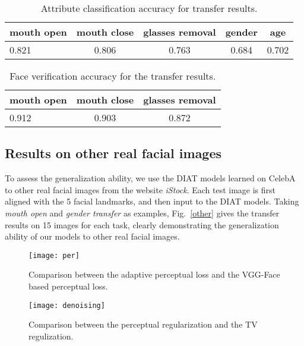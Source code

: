 \documentclass[journal]{IEEEtran}
\begin{document}
\begin{table}[htb]
\scriptsize
\caption{Attribute classification accuracy for transfer results.}
\begin{center}
\begin{tabular}{l|c|c|c|c}
\hline
mouth open & mouth close & glasses removal & gender & age  \\
\hline
0.821 & 0.806 & 0.763 & 0.684 & 0.702 \\
\hline
\end{tabular}
\end{center}
\label{table:classification}
\end{table}

\begin{table}[htb]
\scriptsize
\caption{Face verification accuracy for the transfer results.}
\begin{center}
\begin{tabular}{l|c|c}
\hline
mouth open & mouth close & glasses removal \\
\hline
0.912 & 0.903 & 0.872  \\
\hline
\end{tabular}
\end{center}
\label{table:identification}
\end{table}


\subsection{Results on other real facial images}
To assess the generalization ability, we use the DIAT models learned on CelebA to other real facial images from the website \emph{iStock}.
Each test image is first aligned with the 5 facial landmarks, and then input to the DIAT models.
Taking \emph{mouth open} and \emph{gender transfer} as examples, Fig.~\ref{other} gives the transfer results on 15 images for each task, clearly demonstrating the generalization ability of our models to other real facial images.



\begin{figure*}
\begin{center}
\texttt{[image: per]}
\end{center}
   \caption{Comparison between the adaptive perceptual loss and the VGG-Face based perceptual loss.}
\label{perc}
\end{figure*}

\begin{figure}
\begin{center}
\texttt{[image: denoising]}
\end{center}
   \caption{Comparison between the perceptual regularization and the TV regulization.}
\label{denoising}
\end{figure}
\end{document}
